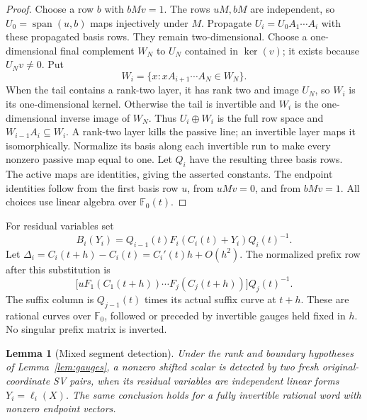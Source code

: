 \documentclass[11pt]{article}
\newtheorem{lemma}[theorem]{Lemma}
\newcommand{\F}{\mathbb F}
\newcommand{\Span}{\operatorname{span}}
\begin{document}
\begin{proof}
Choose a row \(b\) with \(bMv=1\). The rows \(uM,bM\) are independent,
so \(U_0=\Span(u,b)\) maps injectively under \(M\). Propagate
\(U_i=U_0A_1\cdots A_i\) with these propagated basis rows.
They remain two-dimensional. Choose a one-dimensional final complement
\(W_N\) to \(U_N\) contained in \(\ker(v)\); it exists because
\(U_Nv\ne0\). Put
\[
 W_i=\{x:xA_{i+1}\cdots A_N\in W_N\}.
\]
When the tail contains a rank-two layer, it has rank two and image
\(U_N\), so \(W_i\) is its one-dimensional kernel. Otherwise the tail
is invertible and \(W_i\) is the one-dimensional inverse image of
\(W_N\). Thus \(U_i\oplus W_i\) is the full row space and
\(W_{i-1}A_i\subseteq W_i\). A rank-two layer kills the passive line;
an invertible layer maps it isomorphically. Normalize its basis along
each invertible run to make every nonzero passive map equal to one.
Let \(Q_i\) have the resulting three basis rows. The active maps are
identities, giving the asserted constants. The endpoint identities
follow from the first basis row \(u\), from \(uMv=0\), and from
\(bMv=1\). All choices use linear algebra over \(\F_0(t)\).
\end{proof}

For residual variables set
\[
 B_i(Y_i)=Q_{i-1}(t)F_i(C_i(t)+Y_i)Q_i(t)^{-1}.
\]
Let \(\Delta_i=C_i(t+h)-C_i(t)=C_i'(t)h+O(h^2)\).
The normalized prefix row after this substitution is
\begin{equation}\label{eq:prefix}
 \bigl[uF_1(C_1(t+h))\cdots F_j(C_j(t+h))\bigr]Q_j(t)^{-1}.
\end{equation}
The suffix column is \(Q_{j-1}(t)\) times its actual suffix curve at
\(t+h\). These are rational curves over \(\F_0\), followed or preceded
by invertible gauges held fixed in \(h\). No singular prefix matrix is
inverted.

\begin{lemma}[Mixed segment detection]\label{lem:mixed}
Under the rank and boundary hypotheses of Lemma~\ref{lem:gauges}, a
nonzero shifted scalar is detected by two fresh original-coordinate
SV pairs, when its residual variables are independent linear forms
\(Y_i=\ell_i(X)\). The same conclusion holds for a fully invertible
rational word with nonzero endpoint vectors.
\end{lemma}
\end{document}
